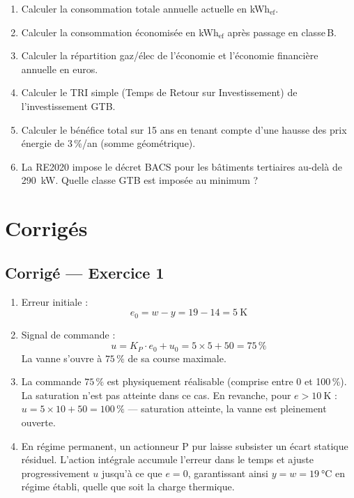 \begin{enumerate}
  \item Calculer la consommation totale annuelle actuelle en kWh$_\text{ef}$.
  \item Calculer la consommation économisée en kWh$_\text{ef}$ après passage en classe\,B.
  \item Calculer la répartition gaz/élec de l'économie et l'économie financière annuelle en euros.
  \item Calculer le TRI simple (Temps de Retour sur Investissement) de l'investissement GTB.
  \item Calculer le bénéfice total sur 15 ans en tenant compte d'une hausse des prix énergie de 3\,\%/an (somme géométrique).
  \item La RE2020 impose le décret BACS pour les bâtiments tertiaires au-delà de \SI{290}{\kilo\watt}. Quelle classe GTB est imposée au minimum ?
\end{enumerate}

\newpage
\section*{Corrigés}

\subsection*{Corrigé — Exercice 1}

\begin{enumerate}
  \item Erreur initiale :
  \[
    e_0 = w - y = 19 - 14 = \boxed{\SI{5}{\kelvin}}
  \]

  \item Signal de commande :
  \[
    u = K_P \cdot e_0 + u_0 = 5 \times 5 + 50 = \boxed{75\,\%}
  \]
  La vanne s'ouvre à $75\,\%$ de sa course maximale.

  \item La commande $75\,\%$ est physiquement réalisable (comprise entre 0 et 100\,\%). La saturation n'est pas atteinte dans ce cas. En revanche, pour $e > \SI{10}{\kelvin}$ : $u = 5 \times 10 + 50 = 100\,\%$ — saturation atteinte, la vanne est pleinement ouverte.

  \item En régime permanent, un actionneur P pur laisse subsister un écart statique résiduel. L'action intégrale accumule l'erreur dans le temps et ajuste progressivement $u$ jusqu'à ce que $e = 0$, garantissant ainsi $y = w = \SI{19}{\celsius}$ en régime établi, quelle que soit la charge thermique.
\end{enumerate}

